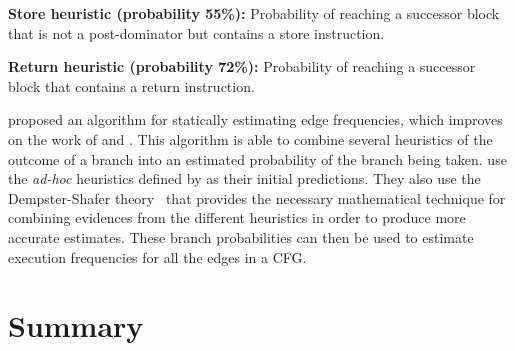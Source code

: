 \noindent\textbf{Store heuristic (probability 55\%):} Probability of reaching a successor block that is not a post-dominator but contains a store instruction.

\noindent\textbf{Return heuristic (probability 72\%):} Probability of reaching a successor block that contains a return instruction.


\cite{wu94} proposed an algorithm for statically estimating edge frequencies, which improves on the work of \cite{wagner94} and \cite{ball93}.
This algorithm is able to combine several heuristics of the outcome of a branch into an estimated probability of the branch being taken.
\cite{wu94} use the \textit{ad-hoc} heuristics defined by \cite{ball93} as their initial predictions.
They also use the Dempster-Shafer theory~\citep{shafer76} that provides the necessary mathematical technique for combining evidences from the different heuristics in order to produce more accurate estimates.
These branch probabilities can then be used to estimate execution frequencies
for all the edges in a CFG.

\section{Summary}
